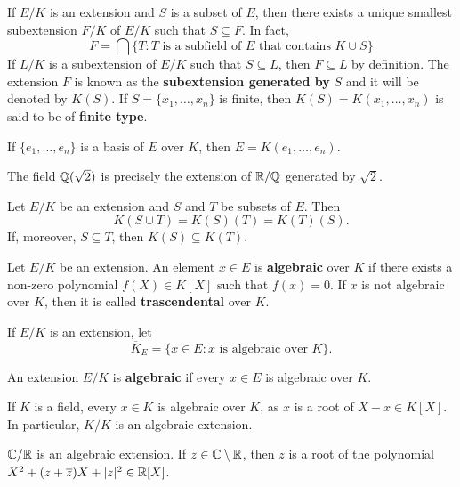 If $E/K$ is an extension and $S$ is a subset of $E$, then
there exists a unique smallest 
subextension $F/K$ of $E/K$ such that
$S\subseteq F$. In fact, 
\[
	F=\bigcap\{T:\text{$T$ is a subfield of $E$ that contains $K\cup S$}\} 
\]
If $L/K$ is a subextension of $E/K$ such that 
$S\subseteq L$, then $F\subseteq L$ by definition. The 
extension $F$ is known as the \textbf{subextension generated by} 
$S$ and
it will be denoted by $K(S)$. 
If $S=\{x_1,\dots,x_n\}$ is finite,
then $K(S)=K(x_1,\dots,x_n)$ is said to be of \textbf{finite type}. 

\begin{example}
	If $\{e_1,\dots,e_n\}$ is a basis of $E$ over $K$, 
	then $E=K(e_1,\dots,e_n)$. 
\end{example}

\begin{example}
	The field $\mathbb{Q}(\sqrt{2})$ is precisely the extension 
	of $\mathbb{R}/\mathbb{Q}$ generated by $\sqrt{2}$. 
\end{example}

Let $E/K$ be an extension and $S$ and $T$ be subsets of $E$.
Then 
\[
	K(S\cup T)=K(S)(T)=K(T)(S).
\]
If, moreover, 
$S\subseteq T$, then $K(S)\subseteq K(T)$. 


\begin{definition}
	Let $E/K$ be an extension. An element $x\in E$
	is \textbf{algebraic} over $K$ if there
	exists a non-zero polynomial 
	$f(X)\in K[X]$ such that $f(x)=0$. If $x$ is
	not algebraic over $K$, 
	then it is called \textbf{trascendental} over $K$.
\end{definition}

If $E/K$ is an extension, let 
\[
	\overline{K}_E=\{x\in E:x\text{ is algebraic over }K\}. 
\]

\begin{definition}	
	An extension $E/K$ is \textbf{algebraic} if 
	every $x\in E$ is algebraic over $K$. 
\end{definition}

If $K$ is a field, every $x\in K$ is algebraic over $K$,
as $x$ is a root of $X-x\in K[X]$. In particular, $K/K$ is
an algebraic extension. 

\begin{example}
	$\mathbb{C}/\mathbb{R}$ is an algebraic extension. If $z\in\mathbb{C}\setminus\mathbb{R}$, then
	$z$ is a root of the polynomial 
	$X^2+(z+\overline{z})X+|z|^2\in\mathbb{R}[X]$. 
\end{example}

